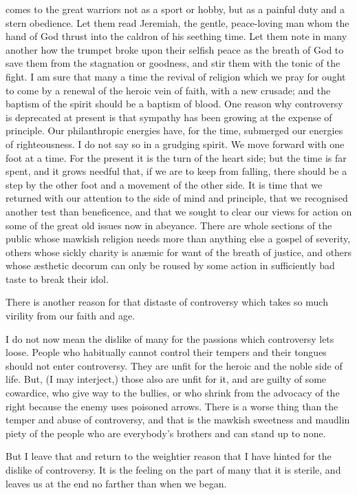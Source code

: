 \documentclass[12pt,a5paper,twoside]{book}
\begin{document}
comes to the great warriors not as a sport or hobby, 
but as a painful duty and a stern obedience. Let 
them read Jeremiah, the gentle, peace-loving man 
whom the hand of God thrust into the caldron of his 
seething time. Let them note in many another how 
the trumpet broke upon their selfish peace as the 
breath of God to save them from the stagnation or 
goodness, and stir them with the tonic of the fight. 
I am sure that many a time the revival of religion 
which we pray for ought to come by a renewal of 
the heroic vein of faith, with a new crusade; and the 
baptism of the spirit should be a baptism of blood. 
One reason why controversy is deprecated at 
present is that sympathy has been growing at the 
expense of principle. Our philanthropic energies 
have, for the time, submerged our energies of righteousness. 
I do not say so in a grudging spirit. We 
move forward with one foot at a time. For the 
present it is the turn of the heart side; but the 
time is far spent, and it grows needful that, if we 
are to keep from falling, there should be a step by the 
other foot and a movement of the other side. It is 
time that we returned with our attention to the side 
of mind and principle, that we recognised another test 
than beneficence, and that we sought to clear our 
views for action on some of the great old issues now 
in abeyance. There are whole sections of the public 
whose mawkish religion needs more than anything 
else a gospel of severity, others whose sickly charity 
is an{\ae}mic for want of the breath of justice, and others 
whose {\ae}sthetic decorum can only be roused by some 
action in sufficiently bad taste to break their idol. 

There is another reason for that distaste of controversy 
which takes so much virility from our faith and 
age. 

I do not now mean the dislike of many for the passions 
which controversy lets loose. People who habitually 
cannot control their tempers and their tongues 
should not enter controversy. They are unfit for the 
heroic and the noble side of life. But, (I may interject,)
those also are unfit for it, and are guilty of 
some cowardice, who give way to the bullies, or 
who shrink from the advocacy of the right because 
the enemy uses poisoned arrows. There is a worse 
thing than the temper and abuse of controversy, 
and that is the mawkish sweetness and maudlin piety 
of the people who are everybody's brothers and can 
stand up to none. 

But I leave that and return to the weightier reason 
that I have hinted for the dislike of controversy. It is 
the feeling on the part of many that it is sterile, and 
leaves us at the end no farther than when we began. 
\end{document}
